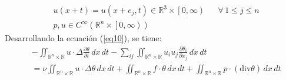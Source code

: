\begin{align}
    &u(x + t) = u(x + e_j,t)\in \mathbb{R}^3 \times  \left[0,\infty \right)&& \forall\, 1\leq j\leq n\label{eq10}\\
    & p,u\in C^{\infty}\left(\mathbb{R}^n \times \left[0,\infty \right) \right)
    \label{eq11}
\end{align}
Desarrollando la ecuación (\ref{eq10}), se tiene:
\begin{align*}
&- \iint_{\mathbb{R}^n \times \mathbb{R}} u \cdot \Delta \frac{\partial \theta}{\partial t} \, dx\, dt - \sum_{ij} \iint_{\mathbb{R}^n \times \mathbb{R}} u_i u_j \frac{\partial \theta_i}{\partial x_j}\,dx\,dt\\
&= \nu \iint_{\mathbb{R}^n \times \mathbb{R}} u \cdot  \Delta \theta\, dx\,dt + \iint_{\mathbb{R}^n \times \mathbb{R}} f \cdot \theta \, dx\, dt + \iint_{\mathbb{R}^n \times \mathbb{R}} p \cdot (\text{div}\theta)\,dx\,dt
\end{align*}

